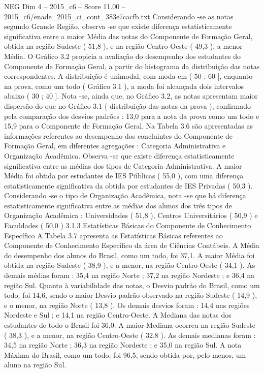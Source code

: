 \begin{textsample}{NEG Dim 4 – 2015\_c6 – Score 11.00 – 2015\_c6/enade\_2015\_ci\_cont\_383e7cacfb.txt}
Considerando -se as notas segundo Grande Região, observa -se que existe diferença estatisticamente significativa entre a maior Média das notas do Componente de Formação Geral, obtida na região Sudeste ( 51,8 ), e na região Centro-Oeste ( 49,3 ), a menor Média.
O Gráfico 3.2 propicia a avaliação do desempenho dos estudantes do Componente de Formação Geral, a partir do histograma da distribuição das notas correspondentes.
A distribuição é unimodal, com moda em ( 50 ; 60 ], enquanto na prova, como um todo ( Gráfico 3.1 ), a moda foi alcançada dois intervalos abaixo ( 30 ; 40 ].
Nota -se, ainda que, no Gráfico 3.2, as notas apresentam maior dispersão do que no Gráfico 3.1 ( distribuição das notas da prova ), confirmado pela comparação dos desvios padrões : 13,0 para a nota da prova como um todo e 15,9 para o Componente de Formação Geral.
Na Tabela 3.6 são apresentadas as informações referentes ao desempenho dos concluintes do Componente de Formação Geral, em diferentes agregações : Categoria Administrativa e Organização Acadêmica.
Observa -se que existe diferença estatisticamente significativa entre as médias dos tipos de Categoria Administrativa.
A maior Média foi obtida por estudantes de IES Públicas ( 55,0 ), com uma diferença estatisticamente significativa da obtida por estudantes de IES Privadas ( 50,3 ).
Considerando -se o tipo de Organização Acadêmica, nota -se que há diferença estatisticamente significativa entre as médias dos alunos dos três tipos de Organização Acadêmica : Universidades ( 51,8 ), Centros Universitários ( 50,9 ) e Faculdades ( 50,0 ) 3.1.3 Estatísticas Básicas do Componente de Conhecimento Específico A Tabela 3.7 apresenta as Estatísticas Básicas referentes ao Componente de Conhecimento Específico da área de Ciências Contábeis.
A Média do desempenho dos alunos do Brasil, como um todo, foi 37,1.
A maior Média foi obtida na região Sudeste ( 38,9 ), e a menor, na região Centro-Oeste ( 34,1 ).
As demais médias foram : 35,4 na região Norte ; 37,2 na região Nordeste ; e 36,4 na região Sul.
Quanto à variabilidade das notas, o Desvio padrão do Brasil, como um todo, foi 14,6, sendo o maior Desvio padrão observado na região Sudeste ( 14,9 ), e o menor, na região Norte ( 13,8 ).
Os demais desvios foram : 14,4 nas regiões Nordeste e Sul ; e 14,1 na região Centro-Oeste.
A Mediana das notas dos estudantes de todo o Brasil foi 36,0.
A maior Mediana ocorreu na região Sudeste ( 38,3 ), e a menor, na região Centro-Oeste ( 32,8 ).
As demais medianas foram : 34,5 na região Norte ; 36,3 na região Nordeste ; e 35,0 na região Sul.
A nota Máxima do Brasil, como um todo, foi 96,5, sendo obtida por, pelo menos, um aluno na região Sul.

\end{textsample}
